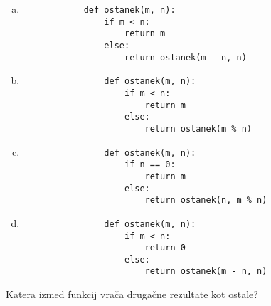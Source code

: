 \documentclass[arhiv, 10pt]{../izpit}
\begin{document}
        \begin{multicols}{2}
        \begin{enumerate}[(a)]
\item 
            \begin{verbatim}
            def ostanek(m, n):
                if m < n:
                    return m
                else:
                    return ostanek(m - n, n)
            \end{verbatim}
        
\item 
                \begin{verbatim}
                def ostanek(m, n):
                    if m < n:
                        return m
                    else:
                        return ostanek(m % n)
                \end{verbatim}
            
\item 
                \begin{verbatim}
                def ostanek(m, n):
                    if n == 0:
                        return m
                    else:
                        return ostanek(n, m % n)
                \end{verbatim}
            
\item 
                \begin{verbatim}
                def ostanek(m, n):
                    if m < n:
                        return 0
                    else:
                        return ostanek(m - n, n)
                \end{verbatim}
            
\end{enumerate}

        \end{multicols}
    
        \naloga*
        
        Katera izmed funkcij vrača drugačne rezultate kot ostale?
    
\end{document}

